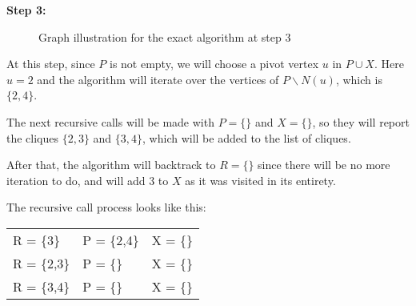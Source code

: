 \begin{minipage}{\linewidth}
    \textbf{Step 3:}

    \begin{minipage}{0.4\textwidth}
        \begin{figure}[H]
            \centering
            \caption{Graph illustration for the exact algorithm at step 3}
            \label{fig:exact-mewc-step3}
        \end{figure}
    \end{minipage}
    \hspace{0.04\linewidth}
    \begin{minipage}{0.55\textwidth}
        At this step, since $P$ is not empty, we will choose a pivot vertex $u$
        in $P\cup X$. Here $u = 2$ and the algorithm will iterate over the
        vertices of $P\backslash N(u)$, which is $\{2,4\}$. \bigskip

        The next recursive calls will be made with $P = \{\}$ and $X = \{\}$, so
        they will report the cliques $\{2,3\}$ and $\{3,4\}$, which will be
        added to the list of cliques. \bigskip

        After that, the algorithm will backtrack to $R=\{\}$ since there will be
        no more iteration to do, and will add $3$ to $X$ as it was visited in
        its entirety. \bigskip

        The recursive call process looks like this:
        \begin{center}
            \begin{tabular}{|lll|}
                \hline
                R = \{3\}   & P = \{2,4\} & X = \{\} \\
                R = \{2,3\} & P = \{\}    & X = \{\} \\
                R = \{3,4\} & P = \{\}    & X = \{\} \\
                \hline
            \end{tabular}
        \end{center}
    \end{minipage}
\end{minipage} \bigskip

